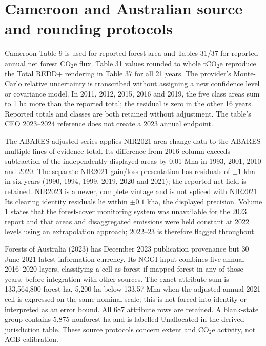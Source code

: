 \section{Cameroon and Australian source and rounding protocols}
Cameroon Table 9 is used for reported forest area and Tables 31/37 for reported annual net forest CO$_2$e flux. Table 31 values rounded to whole tCO$_2$e reproduce the Total REDD+ rendering in Table 37 for all 21 years. The provider's Monte-Carlo relative uncertainty is transcribed without assigning a new confidence level or covariance model. In 2011, 2012, 2015, 2016 and 2019, the five class areas sum to 1 ha more than the reported total; the residual is zero in the other 16 years. Reported totals and classes are both retained without adjustment. The table's CEO 2023--2024 reference does not create a 2023 annual endpoint.

The ABARES-adjusted series applies NIR2021 area-change data to the ABARES multiple-lines-of-evidence total. Its difference-from-2016 column exceeds subtraction of the independently displayed areas by 0.01 Mha in 1993, 2001, 2010 and 2020. The separate NIR2021 gain/loss presentation has residuals of $\pm1$ kha in six years (1990, 1994, 1999, 2019, 2020 and 2021); the reported net field is retained. NIR2023 is a newer, complete vintage and is not spliced with NIR2021. Its clearing identity residuals lie within $\pm0.1$ kha, the displayed precision. Volume 1 states that the forest-cover monitoring system was unavailable for the 2023 report and that areas and disaggregated emissions were held constant at 2022 levels using an extrapolation approach; 2022--23 is therefore flagged throughout.

Forests of Australia (2023) has December 2023 publication provenance but 30 June 2021 latest-information currency. Its NGGI input combines five annual 2016--2020 layers, classifying a cell as forest if mapped forest in any of those years, before integration with other sources. The exact attribute sum is 133,564,800 forest ha, 5,200 ha below 133.57 Mha when the adjusted annual 2021 cell is expressed on the same nominal scale; this is not forced into identity or interpreted as an error bound. All 687 attribute rows are retained. A blank-state group contains 5,875 nonforest ha and is labelled Unallocated in the derived jurisdiction table. These source protocols concern extent and CO$_2$e activity, not AGB calibration.

